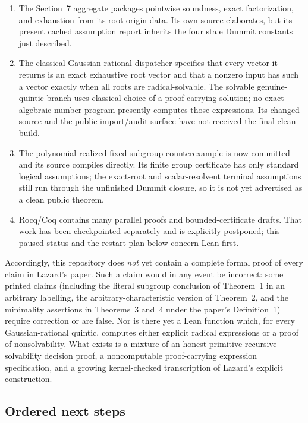 \documentclass[11pt,a4paper,oneside]{article}
\begin{document}
\begin{enumerate}
  final specialized endpoints were checked against the stale top Dummit
  artifact and therefore require a fresh transitive rebuild before being
  promoted here.
\item The Section~7 aggregate packages pointwise soundness, exact
  factorization, and exhaustion from its root-origin data.  Its own source
  elaborates, but its present cached assumption report inherits the four stale
  Dummit constants just described.
\item The classical Gaussian-rational dispatcher specifies that every vector
  it returns is an exact exhaustive root vector and that a nonzero input has
  such a vector exactly when all roots are radical-solvable.  The solvable
  genuine-quintic branch uses classical choice of a proof-carrying solution;
  no exact algebraic-number program presently computes those expressions.
  Its changed source and the public import/audit surface have not received the
  final clean build.
\item The polynomial-realized fixed-subgroup counterexample is now committed
  and its source compiles directly.  Its finite group certificate has only
  standard logical assumptions; the exact-root and scalar-resolvent terminal
  assumptions still run through the unfinished Dummit closure, so it is not
  yet advertised as a clean public theorem.
\item Rocq/Coq contains many parallel proofs and bounded-certificate drafts.
  That work has been checkpointed separately and is explicitly postponed;
  this paused status and the restart plan below concern Lean first.
\end{enumerate}

Accordingly, this repository does \emph{not} yet contain a complete formal
proof of every claim in Lazard's paper.  Such a claim would in any event be
incorrect: some printed claims (including the literal subgroup conclusion of
Theorem~1 in an arbitrary labelling, the arbitrary-characteristic version of
Theorem~2, and the minimality assertions in Theorems~3 and~4 under the paper's
Definition~1) require correction or are false.  Nor is there yet a Lean
function which, for every Gaussian-rational quintic, computes either explicit
radical expressions or a proof of nonsolvability.  What exists is a mixture of
an honest primitive-recursive solvability decision proof, a noncomputable
proof-carrying expression specification, and a growing kernel-checked
transcription of Lazard's explicit construction.

\subsection{Ordered next steps}
\end{document}
